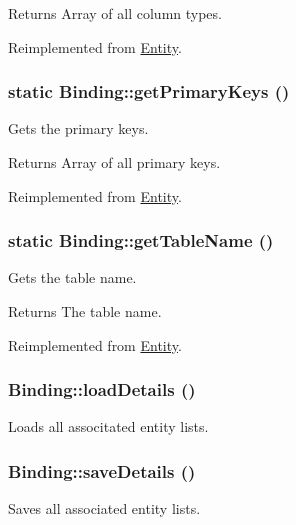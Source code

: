 \begin{DoxyReturn}{Returns}
Array of all column types. 
\end{DoxyReturn}


Reimplemented from \hyperlink{classEntity_ad69437219c10955803707fbf6ac458e7}{Entity}.

\hypertarget{classBinding_ac7539d5770936644b98be102ed66a4e5}{
\subsubsection[{getPrimaryKeys}]{\setlength{\rightskip}{0pt plus 5cm}static Binding::getPrimaryKeys ()}}
\label{classBinding_ac7539d5770936644b98be102ed66a4e5}
Gets the primary keys.

\begin{DoxyReturn}{Returns}
Array of all primary keys. 
\end{DoxyReturn}


Reimplemented from \hyperlink{classEntity_a61bbfbb4058427174e002a09ddc77c41}{Entity}.

\hypertarget{classBinding_aee5dd30aab182b19046ab5164da4c649}{
\subsubsection[{getTableName}]{\setlength{\rightskip}{0pt plus 5cm}static Binding::getTableName ()}}
\label{classBinding_aee5dd30aab182b19046ab5164da4c649}
Gets the table name.

\begin{DoxyReturn}{Returns}
The table name. 
\end{DoxyReturn}


Reimplemented from \hyperlink{classEntity_a8305fd94740ac62cbafb9de76567ce37}{Entity}.

\hypertarget{classBinding_a023428000f04edf6e7654caedfe023d7}{
\subsubsection[{loadDetails}]{\setlength{\rightskip}{0pt plus 5cm}Binding::loadDetails ()}}
\label{classBinding_a023428000f04edf6e7654caedfe023d7}
Loads all associtated entity lists. \hypertarget{classBinding_a7fe288b95f637d4dee16918f985df0ff}{
\subsubsection[{saveDetails}]{\setlength{\rightskip}{0pt plus 5cm}Binding::saveDetails ()}}
\label{classBinding_a7fe288b95f637d4dee16918f985df0ff}
Saves all associated entity lists. 

